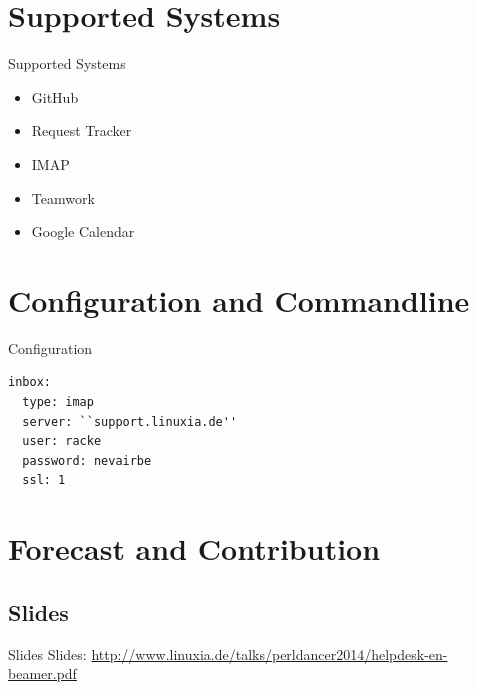 \section{Supported Systems}

\begin{frame}{Supported Systems}
\begin{itemize}
\item GitHub
\item Request Tracker
\item IMAP
\item Teamwork
\item Google Calendar
\end{itemize}
\end{frame}

\section{Configuration and Commandline}
\begin{frame}[fragile]{Configuration}
\begin{lstlisting}
inbox:
  type: imap
  server: ``support.linuxia.de''
  user: racke
  password: nevairbe
  ssl: 1
\end{lstlisting}
\end{frame}

\section{Forecast and Contribution}

\subsection{Slides}

\begin{frame}{Slides}
Slides:
\url{http://www.linuxia.de/talks/perldancer2014/helpdesk-en-beamer.pdf}
\end{frame}



